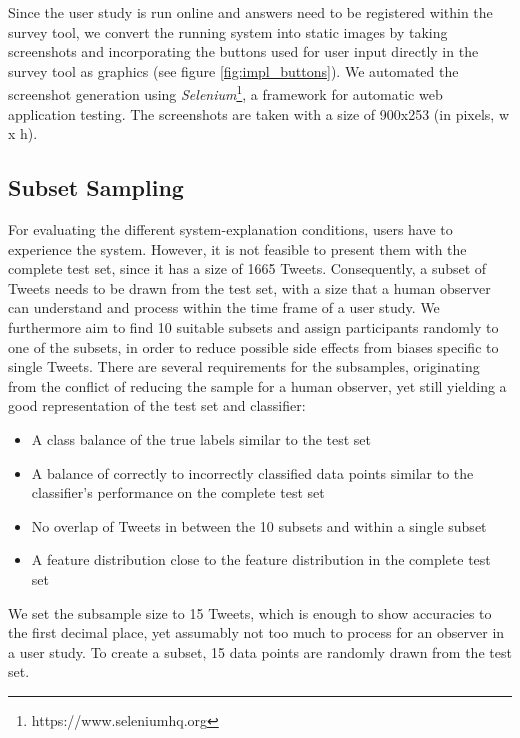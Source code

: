 \noindent Since the user study is run online and answers need to be registered within the survey tool, we convert the running system into static images by taking screenshots and incorporating the buttons used for user input directly in the survey tool as graphics (see figure \ref{fig:impl_buttons}). We automated the screenshot generation using \textit{Selenium}\footnote{https://www.seleniumhq.org}, a framework for automatic web application testing. The screenshots are taken with a size of 900x253 (in pixels, w x h).



\subsection{Subset Sampling}
\label{subsec:subset_sampling}
For evaluating the different system-explanation conditions, users have to experience the system. However, it is not feasible to present them with the complete test set, since it has a size of 1665 Tweets. Consequently, a subset of Tweets needs to be drawn from the test set, with a size that a human observer can understand and process within the time frame of a user study.\newline
We furthermore aim to find 10 suitable subsets and assign participants randomly to one of the subsets, in order to reduce possible side effects from biases specific to single Tweets.\newline
There are several requirements for the subsamples, originating from the conflict of reducing the sample for a human observer, yet still yielding a good representation of the test set and classifier:\newline
\begin{itemize}
	\item A class balance of the true labels similar to the test set
	\item A balance of correctly to incorrectly classified data points similar to the classifier's performance on the complete test set
	\item No overlap of Tweets in between the 10 subsets and within a single subset
	\item A feature distribution close to the feature distribution in the complete test set
\end{itemize}
We set the subsample size to 15 Tweets, which is enough to show accuracies to the first decimal place, yet assumably not too much to process for an observer in a user study.\newline
To create a subset, 15 data points are randomly drawn from the test set. \newline
